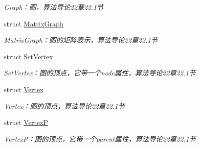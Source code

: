 \begin{DoxyCompactItemize}
\begin{DoxyCompactList}\small\item\em Graph：图，算法导论22章22.1节 \end{DoxyCompactList}\item 
struct \hyperlink{struct_introduction_to_algorithm_1_1_graph_algorithm_1_1_matrix_graph}{Matrix\+Graph}
\begin{DoxyCompactList}\small\item\em Matrix\+Graph：图的矩阵表示，算法导论22章22.1节 \end{DoxyCompactList}\item 
struct \hyperlink{struct_introduction_to_algorithm_1_1_graph_algorithm_1_1_set_vertex}{Set\+Vertex}
\begin{DoxyCompactList}\small\item\em Set\+Vertex：图的顶点，它带一个node属性，算法导论22章22.1节 \end{DoxyCompactList}\item 
struct \hyperlink{struct_introduction_to_algorithm_1_1_graph_algorithm_1_1_vertex}{Vertex}
\begin{DoxyCompactList}\small\item\em Vertex：图的顶点，算法导论22章22.1节 \end{DoxyCompactList}\item 
struct \hyperlink{struct_introduction_to_algorithm_1_1_graph_algorithm_1_1_vertex_p}{Vertex\+P}
\begin{DoxyCompactList}\small\item\em Vertex\+P：图的顶点，它带一个parent属性，算法导论22章22.1节 \end{DoxyCompactList}\end{DoxyCompactItemize}

